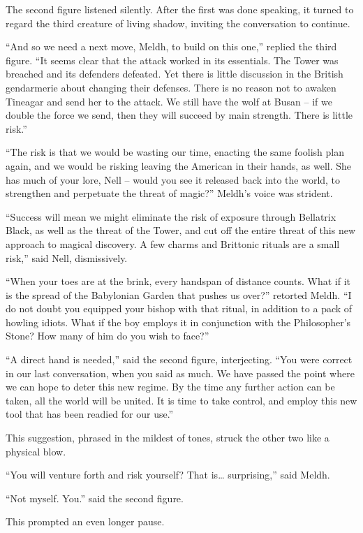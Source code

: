 The second figure listened silently. After the first was done speaking,
it turned to regard the third creature of living shadow, inviting the
conversation to continue.

``And so we need a next move, Meldh, to build on this one,'' replied the
third figure. ``It seems clear that the attack worked in its essentials.
The Tower was breached and its defenders defeated. Yet there is little
discussion in the British gendarmerie about changing their defenses.
There is no reason not to awaken Tineagar and send her to the attack. We
still have the wolf at Busan -- if we double the force we send, then
they will succeed by main strength. There is little risk.''

``The risk is that we would be wasting our time, enacting the same
foolish plan again, and we would be risking leaving the American in
their hands, as well. She has much of your lore, Nell -- would you see
it released back into the world, to strengthen and perpetuate the threat
of magic?'' Meldh's voice was strident.

``Success will mean we might eliminate the risk of exposure through
Bellatrix Black, as well as the threat of the Tower, and cut off the
entire threat of this new approach to magical discovery. A few charms
and Brittonic rituals are a small risk,'' said Nell, dismissively.

``When your toes are at the brink, every handspan of distance counts.
What if it is the spread of the Babylonian Garden that pushes us over?''
retorted Meldh. ``I do not doubt you equipped your bishop with that
ritual, in addition to a pack of howling idiots. What if the boy employs
it in conjunction with the Philosopher's Stone? How many of him do you
wish to face?''

``A direct hand is needed,'' said the second figure, interjecting. ``You
were correct in our last conversation, when you said as much. We have
passed the point where we can hope to deter this new regime. By the time
any further action can be taken, all the world will be united. It is
time to take control, and employ this new tool that has been readied for
our use.''

This suggestion, phrased in the mildest of tones, struck the other two
like a physical blow.

``You will venture forth and risk yourself? That is\ldots{}
surprising,'' said Meldh.

``Not myself. You.'' said the second figure.

This prompted an even longer pause.

